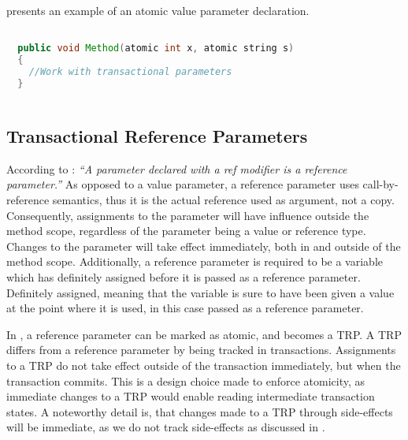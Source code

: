  presents an example of an atomic value parameter declaration.

\begin{lstlisting}[label=lst:design_value_parameter,
  caption={Transactional Value Parameter},
  language=Java,  
  showspaces=false,
  showtabs=false,
  breaklines=true,
  showstringspaces=false,
  breakatwhitespace=true,
  commentstyle=\color{greencomments},
  keywordstyle=\color{bluekeywords},
  stringstyle=\color{redstrings},
  morekeywords={atomic, retry, orElse, var, get, set}]  % Start your code-block

  public void Method(atomic int x, atomic string s)
  {
  	//Work with transactional parameters
  }
    
\end{lstlisting}

\subsection{Transactional Reference Parameters}
\label{subsec:stm_desgin_ref_parameters}
According to \cite[p. 97]{csharp2013specificaiton}: \textit{``A parameter declared with a ref modifier is a reference parameter.''} As opposed to a value parameter, a reference parameter uses call-by-reference semantics, thus it is the actual reference used as argument, not a copy. Consequently, assignments to the parameter  will have influence outside the method scope, regardless of the parameter being a value or reference type. Changes to the parameter will take effect immediately, both in and outside of the method scope\cite[p. 42]{sestoft2011c}. Additionally, a reference parameter is required to be a variable which has definitely assigned before it is passed as a reference parameter\cite[p. 97]{csharp2013specificaiton}. Definitely assigned, meaning that the variable is sure to have been given a value at the point where it is used\cite[p. 96]{csharp2013specificaiton}, in this case passed as a reference parameter.

In \stmname, a reference parameter can be marked as atomic, and becomes a \ac{TRP}. A \ac{TRP} differs from a reference parameter by being tracked in transactions. Assignments to a \ac{TRP} do not take effect outside of the transaction immediately, but when the transaction commits. This is a design choice made to enforce atomicity, as immediate changes to a \ac{TRP} would enable reading intermediate transaction states. A noteworthy detail is, that changes made to a \ac{TRP} through side-effects will be immediate, as we do not track side-effects as discussed in .

